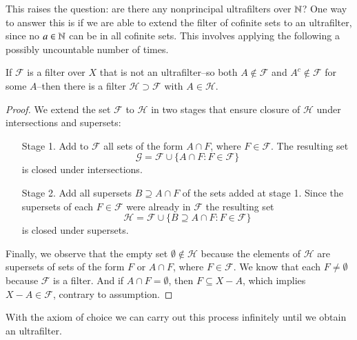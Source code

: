 \documentclass[12pt, a4paper, oneside, openright, titlepage]{book}
\begin{document}
This raises the question: are there any nonprincipal ultrafilters over $\mathbb N$? One way to answer this is if we are able to extend the filter of cofinite sets to an ultrafilter, since no $a \in \mathbb N$ can be in all cofinite sets. This involves applying the following a possibly uncountable number of times.

\begin{thm}
    If $\mathcal{F}$ is a filter over $X$ that is not an ultrafilter\---so both $A \notin \mathcal{F}$ and $A^c\notin \mathcal{F}$ for some $A$\---then there is a filter $\mathcal{H}\supset \mathcal{F}$ with $A \in \mathcal{H}$.
\end{thm}
\begin{proof}
    We extend the set $\mathcal{F}$ to $\mathcal{H}$ in two stages that ensure closure of $\mathcal{H}$ under intersections and supersets: 
    \begin{itemize}
        \item[Stage 1.] Add to $\mathcal{F}$ all sets of the form $A\cap F$, where $F \in \mathcal{F}$. The resulting set $$\mathcal{G} = \mathcal{F} \cup \{A\cap F:F \in \mathcal{F}\}$$
            is closed under intersections.
        \item[Stage 2.] Add all supersets $B \supseteq A\cap F$ of the sets added at stage 1. Since the supersets of each $F \in \mathcal{F}$ were already in $\mathcal{F}$ the resulting set \begin{equation*}
                \mathcal{H} = \mathcal{F} \cup \{B \supseteq A\cap F:F \in \mathcal{F}\}
        \end{equation*}
            is closed under supersets.
    \end{itemize}
    Finally, we observe that the empty set $\emptyset \notin \mathcal{H}$ because the elements of $\mathcal{H}$ are supersets of sets of the form $F$ or $A\cap F$, where $F \in \mathcal{F}$. We know that each $F \neq \emptyset$ because $\mathcal{F}$ is a filter. And if $A\cap F = \emptyset$, then $F \subseteq X-A$, which implies $X-A \in \mathcal{F}$, contrary to assumption.
\end{proof}

With the axiom of choice we can carry out this process infinitely until we obtain an ultrafilter.
\end{document}
